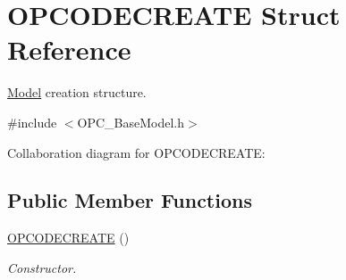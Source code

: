 \hypertarget{struct_o_p_c_o_d_e_c_r_e_a_t_e}{\section{O\+P\+C\+O\+D\+E\+C\+R\+E\+A\+T\+E Struct Reference}
\label{struct_o_p_c_o_d_e_c_r_e_a_t_e}
}


\hyperlink{class_model}{Model} creation structure.  




{\ttfamily \#include $<$O\+P\+C\+\_\+\+Base\+Model.\+h$>$}



Collaboration diagram for O\+P\+C\+O\+D\+E\+C\+R\+E\+A\+T\+E\+:
\subsection*{Public Member Functions}
\begin{DoxyCompactItemize}
\item 
\hyperlink{struct_o_p_c_o_d_e_c_r_e_a_t_e_a7e0b19c00a6986b00db60be7bead9886}{O\+P\+C\+O\+D\+E\+C\+R\+E\+A\+T\+E} ()
\begin{DoxyCompactList}\small\item\em Constructor. \end{DoxyCompactList}\end{DoxyCompactItemize}
